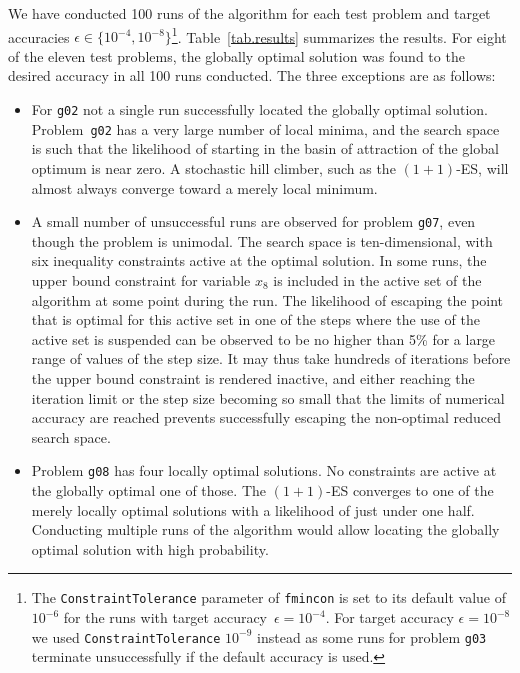 \documentclass[oribibl]{llncs}
\begin{document}
We have conducted 100 runs of the algorithm for each test problem and target accuracies $\epsilon\in\{10^{-4},10^{-8}\}$\footnote{The \texttt{ConstraintTolerance} parameter of \texttt{fmincon} is set to its default value of $10^{-6}$ for the runs with target accuracy~$\epsilon=10^{-4}$. For target accuracy $\epsilon=10^{-8}$ we used \texttt{ConstraintTolerance} $10^{-9} $ instead as some runs for problem \texttt{g03} terminate unsuccessfully if the default accuracy is used.}. Table~\ref{tab.results} summarizes the results. For eight of the eleven test problems, the globally optimal solution was found to the desired accuracy in all 100 runs conducted. The three exceptions are as follows:
\begin{itemize}
  \item For \texttt{g02} not a single run successfully located the globally optimal solution. Problem~\texttt{g02} has a very large number of local minima, and the search space is such that the likelihood of starting in the basin of attraction of the global optimum is near zero. A stochastic hill climber, such as the $(1+1)$-ES, will almost always converge toward a merely local minimum.
  \item A small number of unsuccessful runs are observed for problem \texttt{g07}, even though the problem is unimodal. The search space is ten-dimensional, with six inequality constraints active at the optimal solution. In some runs, the upper bound constraint for variable $x_8$ is included in the active set of the algorithm at some point during the run. The likelihood of escaping the point that is optimal for this active set in one of the steps where the use of the active set is suspended can be observed to be no higher than 5\% for a large range of values of the step size. It may thus take hundreds of iterations before the upper bound constraint is rendered inactive, and either reaching the iteration limit or the step size becoming so small that the limits of numerical accuracy are reached prevents successfully escaping the non-optimal reduced search space.
  \item Problem \texttt{g08} has four locally optimal solutions. No constraints are active at the globally optimal one of those. The $(1+1)$-ES converges to one of the merely locally optimal solutions with a likelihood of just under one half. Conducting multiple runs of the algorithm would allow locating the globally optimal solution with high probability.
\end{itemize}
\end{document}
